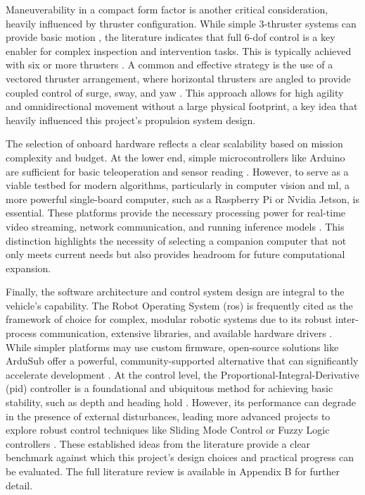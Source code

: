 \documentclass[11pt, a4paper]{article}
\begin{document}
Maneuverability in a compact form factor is another critical consideration, heavily influenced by thruster configuration. While simple 3-thruster systems can provide basic motion \cite{5355247}, the literature indicates that full 6-\gls{dof} control is a key enabler for complex inspection and intervention tasks. This is typically achieved with six or more thrusters \cite{marzbanrad_2011_design, 9965928}. A common and effective strategy is the use of a vectored thruster arrangement, where horizontal thrusters are angled to provide coupled control of surge, sway, and yaw \cite{10200265, 9659412}. This approach allows for high agility and omnidirectional movement without a large physical footprint, a key idea that heavily influenced this project's propulsion system design.

The selection of onboard hardware reflects a clear scalability based on mission complexity and budget. At the lower end, simple microcontrollers like Arduino are sufficient for basic teleoperation and sensor reading \cite{8309454, 5355247}. However, to serve as a viable testbed for modern algorithms, particularly in computer vision and \gls{ml}, a more powerful single-board computer, such as a Raspberry Pi or Nvidia Jetson, is essential. These platforms provide the necessary processing power for real-time video streaming, network communication, and running inference models \cite{10200265, 10928203, 8558880, 8729822}. This distinction highlights the necessity of selecting a companion computer that not only meets current needs but also provides headroom for future computational expansion.

Finally, the software architecture and control system design are integral to the vehicle's capability. The Robot Operating System (\gls{ros}) is frequently cited as the framework of choice for complex, modular robotic systems due to its robust inter-process communication, extensive libraries, and available hardware drivers \cite{9965928, 8558880}. While simpler platforms may use custom firmware, open-source solutions like ArduSub offer a powerful, community-supported alternative that can significantly accelerate development \cite{9447108}. At the control level, the Proportional-Integral-Derivative (\gls{pid}) controller is a foundational and ubiquitous method for achieving basic stability, such as depth and heading hold \cite{10928203, marzbanrad_2011_design}. However, its performance can degrade in the presence of external disturbances, leading more advanced projects to explore robust control techniques like Sliding Mode Control or Fuzzy Logic controllers \cite{5355247, 7946564}. These established ideas from the literature provide a clear benchmark against which this project's design choices and practical progress can be evaluated. The full literature review is available in Appendix B for further detail.
\end{document}
